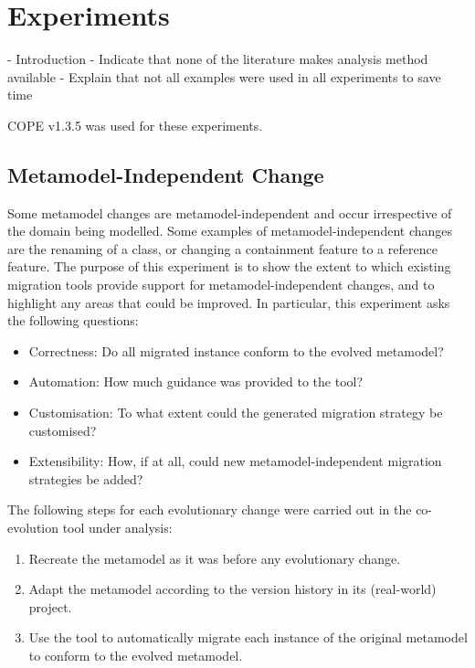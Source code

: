 
\chapter{Experiments}
\label{Experiments}

- Introduction
- Indicate that none of the literature makes analysis method available
- Explain that not all examples were used in all experiments to save time

COPE v1.3.5 was used for these experiments.


\section{Metamodel-Independent Change}
Some metamodel changes are metamodel-independent and occur irrespective of the domain being modelled. Some examples of metamodel-independent changes are the renaming of a class, or changing a containment feature to a reference feature. The purpose of this experiment is to show the extent to which existing migration tools provide support for metamodel-independent changes, and to highlight any areas that could be improved. In particular, this experiment asks the following questions:

\begin{itemize}
	\item Correctness: Do all migrated instance conform to the evolved metamodel?
	\item Automation: How much guidance was provided to the tool?
  \item Customisation: To what extent could the generated migration strategy be customised?
  \item Extensibility: How, if at all, could new metamodel-independent migration strategies be added?
\end{itemize}

The following steps for each evolutionary change were carried out in the co-evolution tool under analysis:

\begin{enumerate}
	\item Recreate the metamodel as it was before any evolutionary change.
	\item Adapt the metamodel according to the version history in its (real-world) project.
	\item Use the tool to automatically migrate each instance of the original metamodel to conform to the evolved metamodel.
\end{enumerate}

